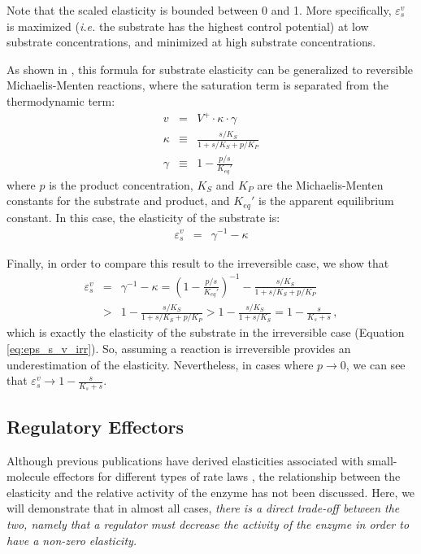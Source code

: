 \documentclass[12pt,a4paper]{article}
\begin{document}
Note that the scaled elasticity is bounded between 0 and 1. More specifically, $\varepsilon_s^v$ is maximized (\textit{i.e.} the substrate has the highest control potential) at low substrate concentrations, and minimized at high substrate concentrations.

As shown in \cite{Noor2013-vv}, this formula for substrate elasticity can be generalized to reversible Michaelis-Menten reactions, where the saturation term is separated from the thermodynamic term:
\begin{eqnarray}
    v &=& V^+ \cdot \kappa \cdot \gamma \\
    \kappa &\equiv& \frac{s/K_S}{1 + s/K_S + p/K_P} \\
    \gamma &\equiv& 1 - \frac{p/s}{K_{eq}'}
\end{eqnarray}
where $p$ is the product concentration, $K_S$ and $K_P$ are the Michaelis-Menten constants for the substrate and product, and $K_{eq}'$ is the apparent equilibrium constant. In this case, the elasticity of the substrate is:
\begin{eqnarray}
    \varepsilon_s^v &=& \gamma^{-1} - \kappa
\end{eqnarray}

Finally, in order to compare this result to the irreversible case, we show that
\begin{eqnarray}\label{eq:reversible_substrate_eps}
\varepsilon_{s}^v &=& \gamma^{-1} - \kappa = \left(1 - \frac{p/s}{K_{eq}'}\right)^{-1} - \frac{s/K_S}{1 + s/K_S + p/K_P} \nonumber\\
&>& 1 - \frac{s/K_S}{1 + s/K_S + p/K_P} > 1 - \frac{s/K_S}{1 + s/K_S} = 1 - \frac{s}{K_s + s}\,,
\end{eqnarray}
which is exactly the elasticity of the substrate in the irreversible case (Equation \ref{eq:eps_s_v_irr}). So, assuming a reaction is irreversible provides an underestimation of the elasticity. Nevertheless, in cases where $p \rightarrow 0$, we can see that $\varepsilon_{s}^v \rightarrow 1 - \frac{s}{K_s + s}$.

\subsection{Regulatory Effectors}
Although previous publications have derived elasticities associated with small-molecule effectors for different types of rate laws \cite{Heinrich1974-yj, Liebermeister2010-vd}, the relationship between the elasticity and the relative activity of the enzyme has not been discussed. Here, we will demonstrate that in almost all cases, \emph{there is a direct trade-off between the two, namely that a regulator must decrease the activity of the enzyme in order to have a non-zero elasticity.}
\end{document}
